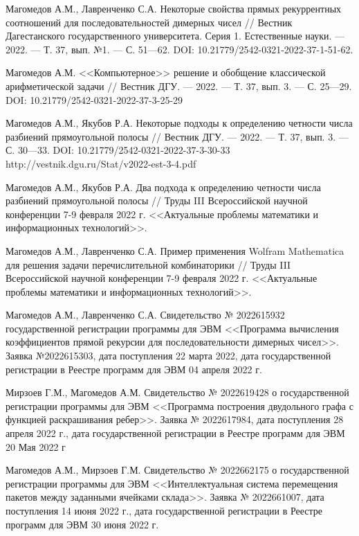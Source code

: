 \begin{thebibliography}{111}
Магомедов А.М., Лавренченко С.А. 
Некоторые свойства прямых рекуррентных соотношений для последовательностей димерных чисел
//
Вестник Дагестанского государственного университета. Серия 1. Естественные науки.
--- 2022.
--- Т. 37, вып. №1.
--- С. 51---62.
DOI: 10.21779/2542-0321-2022-37-1-51-62.

Магомедов А.М.
<<Компьютерное>> решение и обобщение классической арифметической задачи
//
Вестник ДГУ.
--- 2022.
--- Т. 37, вып. 3.
--- С. 25---29.
DOI: 10.21779/2542-0321-2022-37-3-25-29 

Магомедов А.М., Якубов Р.А.
Некоторые подходы к определению четности числа разбиений прямоугольной полосы
//
Вестник ДГУ.
--- 2022.
--- Т. 37, вып. 3.
--- С. 30---33.
DOI: 10.21779/2542-0321-2022-37-3-30-33
http://vestnik.dgu.ru/Stat/v2022-est-3-4.pdf

Магомедов А.М., Якубов Р.А.
Два подхода к определению четности числа разбиений прямоугольной полосы
//
Труды III Всероссийской научной конференции 7-9 февраля 2022 г. <<Актуальные проблемы математики и информационных технологий>>.

Магомедов А.М., Лавренченко С.А. 
Пример применения Wolfram Mathematica для решения задачи перечислительной комбинаторики
//
Труды III Всероссийской научной конференции 7-9 февраля 2022 г.  <<Актуальные проблемы математики и информационных технологий>>.

Магомедов А.М., Лавренченко С.А. 
Свидетельство № 2022615932 государственной регистрации программы для ЭВМ <<Программа вычисления коэффициентов прямой рекурсии для последовательности димерных чисел>>. Заявка №2022615303, дата поступления 22 марта 2022, дата государственной регистрации в Реестре программ для ЭВМ 04 апреля 2022 г.

Мирзоев Г.М., Магомедов А.М. 
Свидетельство № 2022619428 о государственной регистрации программы для ЭВМ <<Программа построения двудольного графа с функцией раскрашивания ребер>>. Заявка № 2022617984, дата поступления 28 апреля 2022 г., дата государственной регистрации в Реестре программ для ЭВМ 20 Мая 2022 г

Магомедов А.М., Мирзоев Г.М. 
Свидетельство № 2022662175 о государственной регистрации программы для ЭВМ <<Интеллектуальная система перемещения пакетов между заданными ячейками склада>>. Заявка № 2022661007, дата поступления 14 июня 2022 г., дата государственной регистрации в Реестре программ для ЭВМ 30 июня 2022 г.


\end{thebibliography}
